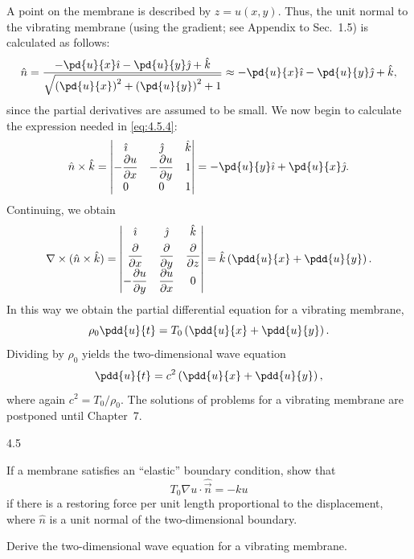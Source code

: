 A point on the membrane is described by $z = u(x,y)$.  Thus, the unit normal to the vibrating membrane (using the gradient; see Appendix to Sec.~1.5) is calculated as follows:
\[
\hat{n} = \frac{-\pd{u}{x}\hat{\imath} - \pd{u}{y}\hat{\jmath} + \hat{k}}{\sqrt{\left(\pd{u}{x}\right)^2 + \left(\pd{u}{y}\right)^2 + 1}} \approx -\pd{u}{x}\hat{\imath} - \pd{u}{y}\hat{\jmath} + \hat{k},
\]
since the partial derivatives are assumed to be small.  We now begin to calculate the expression needed in \eqref{eq:4.5.4}:
\[
\hat{n}\times\hat{k} = \begin{vmatrix} \hat{\imath} & \hat{\jmath} & \hat{k} \\ -\dfrac{\partial u}{\partial x} & -\dfrac{\partial u}{\partial y} & 1 \\ 0 & 0 & 1 \end{vmatrix} = -\pd{u}{y}\hat{\imath} + \pd{u}{x}\hat{\jmath}.
\]
Continuing, we obtain
\[
\nabla\times(\hat{n}\times\hat{k}) = \begin{vmatrix} \hat{\imath} & \hat{\jmath} & \hat{k} \\[4pt] \dfrac{\partial}{\partial x} & \dfrac{\partial}{\partial y} & \dfrac{\partial}{\partial z} \\[4pt] -\dfrac{\partial u}{\partial y} & \dfrac{\partial u}{\partial x} & 0 \end{vmatrix} = \hat{k}\left(\pdd{u}{x} + \pdd{u}{y}\right).
\]
In this way we obtain the partial differential equation for a vibrating membrane,
\[
\rho_0\pdd{u}{t} = T_0\left(\pdd{u}{x} + \pdd{u}{y}\right).
\]
Dividing by $\rho_0$ yields the two-dimensional wave equation
\begin{equation}
\pdd{u}{t} = c^2\left(\pdd{u}{x} + \pdd{u}{y}\right),
\label{eq:4.5.5}
\end{equation}
where again $c^2 = T_0/\rho_0$.  The solutions of problems for a vibrating membrane are postponed until Chapter~7.

\begin{exercises}{4.5}

\item If a membrane satisfies an ``elastic'' boundary condition, show that
\begin{equation}
T_0\nabla u\cdot\hat{\vec{n}} = -ku
\label{eq:4.5.6}
\end{equation}
if there is a restoring force per unit length proportional to the displacement, where $\hat{n}$ is a unit normal of the two-dimensional boundary.

\item Derive the two-dimensional wave equation for a vibrating membrane.

\end{exercises}
